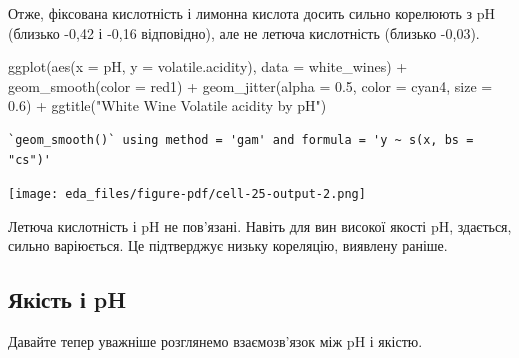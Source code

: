 \documentclass[
  letterpaper,
  DIV=11,
  numbers=noendperiod]{scrreprt}
\newenvironment{Shaded}{\begin{snugshade}}{\end{snugshade}}
\newcommand{\AttributeTok}[1]{\textcolor[rgb]{0.40,0.45,0.13}{#1}}
\newcommand{\FloatTok}[1]{\textcolor[rgb]{0.68,0.00,0.00}{#1}}
\newcommand{\FunctionTok}[1]{\textcolor[rgb]{0.28,0.35,0.67}{#1}}
\newcommand{\NormalTok}[1]{\textcolor[rgb]{0.00,0.23,0.31}{#1}}
\newcommand{\SpecialCharTok}[1]{\textcolor[rgb]{0.37,0.37,0.37}{#1}}
\newcommand{\StringTok}[1]{\textcolor[rgb]{0.13,0.47,0.30}{#1}}
\begin{document}
Отже, фіксована кислотність і лимонна кислота досить сильно корелюють з
pH (близько -0,42 і -0,16 відповідно), але не летюча кислотність
(близько -0,03).

\begin{Shaded}
\begin{Highlighting}[]
\FunctionTok{ggplot}\NormalTok{(}\FunctionTok{aes}\NormalTok{(}\AttributeTok{x =}\NormalTok{ pH, }\AttributeTok{y =}\NormalTok{ volatile.acidity), }\AttributeTok{data =}\NormalTok{ white\_wines) }\SpecialCharTok{+}
  \FunctionTok{geom\_smooth}\NormalTok{(}\AttributeTok{color =} \StringTok{\textquotesingle{}red1\textquotesingle{}}\NormalTok{) }\SpecialCharTok{+}
  \FunctionTok{geom\_jitter}\NormalTok{(}\AttributeTok{alpha =} \FloatTok{0.5}\NormalTok{, }\AttributeTok{color =} \StringTok{\textquotesingle{}cyan4\textquotesingle{}}\NormalTok{, }\AttributeTok{size =} \FloatTok{0.6}\NormalTok{) }\SpecialCharTok{+}
  \FunctionTok{ggtitle}\NormalTok{(}\StringTok{"White Wine Volatile acidity by pH"}\NormalTok{)}
\end{Highlighting}
\end{Shaded}

\begin{verbatim}
`geom_smooth()` using method = 'gam' and formula = 'y ~ s(x, bs = "cs")'
\end{verbatim}

\texttt{[image: eda\_files/figure-pdf/cell-25-output-2.png]}

Летюча кислотність і pH не пов'язані. Навіть для вин високої якості pH,
здається, сильно варіюється. Це підтверджує низьку кореляцію, виявлену
раніше.

\subsection{Якість і pH}\label{ux44fux43aux456ux441ux442ux44c-ux456-ph}

Давайте тепер уважніше розглянемо взаємозв'язок між pH і якістю.
\end{document}
